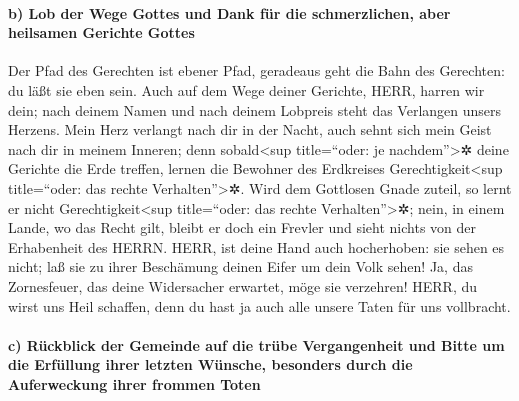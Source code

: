 \hypertarget{b-lob-der-wege-gottes-und-dank-fuxfcr-die-schmerzlichen-aber-heilsamen-gerichte-gottes}{%
\paragraph{b) Lob der Wege Gottes und Dank für die schmerzlichen, aber
heilsamen Gerichte
Gottes}\label{b-lob-der-wege-gottes-und-dank-fuxfcr-die-schmerzlichen-aber-heilsamen-gerichte-gottes}}

Der Pfad des Gerechten ist ebener Pfad, geradeaus geht die
Bahn des Gerechten: du läßt sie eben sein. Auch auf dem
Wege deiner Gerichte, HERR, harren wir dein; nach deinem Namen und nach
deinem Lobpreis steht das Verlangen unsers Herzens. Mein
Herz verlangt nach dir in der Nacht, auch sehnt sich mein Geist nach dir
in meinem Inneren; denn sobald\textless sup title=``oder: je
nachdem''\textgreater✲ deine Gerichte die Erde treffen, lernen die
Bewohner des Erdkreises Gerechtigkeit\textless sup title=``oder: das
rechte Verhalten''\textgreater✲. Wird dem Gottlosen Gnade
zuteil, so lernt er nicht Gerechtigkeit\textless sup title=``oder: das
rechte Verhalten''\textgreater✲; nein, in einem Lande, wo das Recht
gilt, bleibt er doch ein Frevler und sieht nichts von der Erhabenheit
des HERRN. HERR, ist deine Hand auch hocherhoben: sie
sehen es nicht; laß sie zu ihrer Beschämung deinen Eifer um dein Volk
sehen! Ja, das Zornesfeuer, das deine Widersacher erwartet, möge sie
verzehren! HERR, du wirst uns Heil schaffen, denn du hast
ja auch alle unsere Taten für uns vollbracht.

\hypertarget{c-ruxfcckblick-der-gemeinde-auf-die-truxfcbe-vergangenheit-und-bitte-um-die-erfuxfcllung-ihrer-letzten-wuxfcnsche-besonders-durch-die-auferweckung-ihrer-frommen-toten}{%
\paragraph{c) Rückblick der Gemeinde auf die trübe Vergangenheit und
Bitte um die Erfüllung ihrer letzten Wünsche, besonders durch die
Auferweckung ihrer frommen
Toten}\label{c-ruxfcckblick-der-gemeinde-auf-die-truxfcbe-vergangenheit-und-bitte-um-die-erfuxfcllung-ihrer-letzten-wuxfcnsche-besonders-durch-die-auferweckung-ihrer-frommen-toten}}

